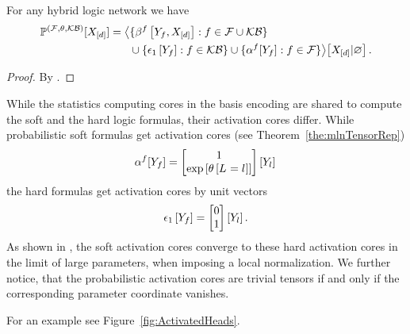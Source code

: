 \begin{theorem}
    \label{the:hybridNetworkRepresentation}
    For any hybrid logic network we have
    \begin{align*}
        \mathbb{P}^{(\mathcal{F},\theta,\mathcal{KB})}[X_{[d]}]
        = \big\langle 
            &\{\beta^{f}\left[Y_{f},X_{[d]}\right] : f\in\mathcal{F}\cup\mathcal{KB} \} \\
            &\cup \{\epsilon_1\left[Y_{f}\right] : f\in\mathcal{KB} \}
            \cup \{\alpha^{f}[Y_{f}] : f\in\mathcal{F} \}
         \big\rangle \big[ X_{[d]} | \varnothing \big] \, .
    \end{align*}
\end{theorem}
\begin{proof}
    By .
\end{proof}

While the statistics computing cores in the basis encoding are shared to compute the soft and the hard logic formulas, their activation cores differ.
While probabilistic soft formulas get activation cores (see Theorem~\ref{the:mlnTensorRep})
\begin{align*}
    \alpha^{f}[Y_{f}]
    = \begin{bmatrix}
          1 \\
          \mathrm{exp}\left[\theta\left[L_{}=l_{}\right]\right]
    \end{bmatrix}[Y_{l}] \,
\end{align*}
the hard formulas get activation cores by unit vectors
\begin{align*}
    \epsilon_1\left[Y_{f}\right]
    = \begin{bmatrix}
          0 \\
          1
    \end{bmatrix}[Y_{l}] \, .
\end{align*}
As shown in , the soft activation cores converge to these hard activation cores in the limit of large parameters, when imposing a local normalization.
%
We further notice, that the probabilistic activation cores are trivial tensors if and only if the corresponding parameter coordinate vanishes.


For an example see Figure~\ref{fig:ActivatedHeads}.

